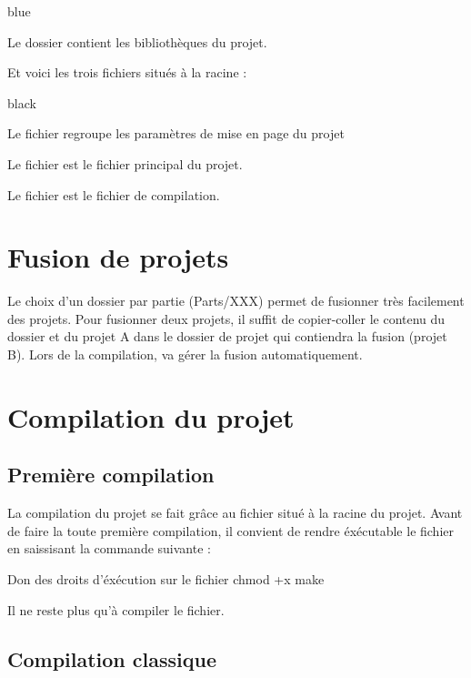 \begin{items}{blue}{\Triangle}
    \item Le dossier  contient les bibliothèques du projet.

    Et voici les trois fichiers situés à la racine : 
    \begin{items}{black}{\Triangle}
        \item Le fichier  regroupe les paramètres de mise en page du projet
        \item Le fichier  est le fichier principal du projet.
        \item Le fichier  est le fichier de compilation.
    \end{items}
\end{items}

\section{Fusion de projets}

Le choix d'un dossier par partie (Parts/XXX) permet de fusionner très facilement des projets.
Pour fusionner deux projets, il suffit de copier-coller le contenu du dossier  et  du projet A dans le dossier de projet qui contiendra la fusion (projet B). Lors de la compilation,  va gérer la fusion automatiquement.


\section{Compilation du projet}

\subsection{Première compilation}

La compilation du projet se fait grâce au fichier  situé à la racine du projet.
Avant de faire la toute première compilation, il convient de rendre éxécutable le fichier  en saissisant la commande suivante : 
    
\begin{Bash}{Don des droits d'éxécution sur le fichier }
chmod +x make
\end{Bash}

Il ne reste plus qu'à compiler le fichier.

\subsection{Compilation classique}

